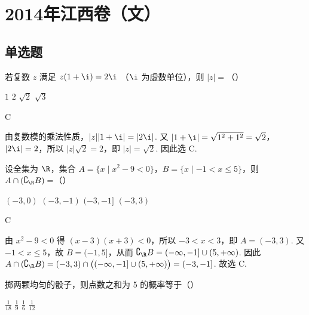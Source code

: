 \chapter{2014年江西卷（文）}

\section{单选题}

\begin{problem}
若复数 \(z\) 满足 \(z(1 + \i) = 2\i\) （\(\i\) 为虚数单位），则 \(|z| =\)（\quad）

\choices
    {\(1\)}
    {\(2\)}
    {\(\sqrt{2}\)}
    {\(\sqrt{3}\)}
\end{problem}

\begin{answer}
C
\end{answer}

\begin{solution}
由复数模的乘法性质，\(\lvert z\rvert\lvert 1+\i\rvert=\lvert 2\i\rvert\). 又 \(\lvert 1+\i\rvert=\sqrt{1^2+1^2}=\sqrt{2}\)，\(\lvert 2\i\rvert=2\)，所以 \(\lvert z\rvert\sqrt{2}=2\)，即 \(\lvert z\rvert=\sqrt{2}\). 因此选 C.
\end{solution}

\begin{problem}
设全集为 \(\R\)，集合 \(A = \{x \mid x^2 - 9 < 0\}\)，\(B = \{x \mid -1 < x \leqslant 5\}\)，则 \(A \cap (\complement_{\R} B) =\)（\quad）

\choices
    {\((-3,0)\)}
    {\((-3, -1)\)}
    {\((-3, -1]\)}
    {\((-3, 3)\)}
\end{problem}

\begin{answer}
C
\end{answer}

\begin{solution}
由 \(x^2-9<0\) 得 \((x-3)(x+3)<0\)，所以 \(-3<x<3\)，即 \(A=(-3,3)\). 又 \(-1<x\leqslant5\)，故 \(B=(-1,5]\)，从而 \(\complement_{\R}B=(-\infty,-1]\cup(5,+\infty)\). 因此
\(A\cap(\complement_{\R}B)=(-3,3)\cap\bigl((-\infty,-1]\cup(5,+\infty)\bigr)=(-3,-1]\). 故选 C.
\end{solution}

\begin{problem}
掷两颗均匀的骰子，则点数之和为 5 的概率等于（\quad）

\choices
    {\(\frac{1}{18}\)}
    {\(\frac{1}{9}\)}
    {\(\frac{1}{6}\)}
    {\(\frac{1}{12}\)}
\end{problem}

